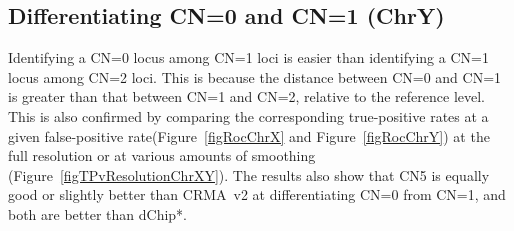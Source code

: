 \documentclass{bioinfo}
\newcommand{\TPrates}{true-positive rates\xspace}
\newcommand{\FPrate}{false-positive rate\xspace}
\begin{document}
\subsection{Differentiating CN=0 and CN=1 (ChrY)}
Identifying a CN=0 locus among CN=1 loci is easier than identifying a CN=1 locus among CN=2 loci.  
This is because the distance between CN=0 and CN=1 is greater than that between CN=1 and CN=2, relative to the reference level. 
This is also confirmed by comparing the corresponding \TPrates at a given \FPrate (Figure~\ref{figRocChrX} and Figure~\ref{figRocChrY}) at the full resolution or at various amounts of smoothing (Figure~\ref{figTPvResolutionChrXY}).  
The results also show that CN5 is equally good or slightly better than CRMA~v2 at differentiating CN=0 from CN=1, and both are better than dChip*.
\end{document}
